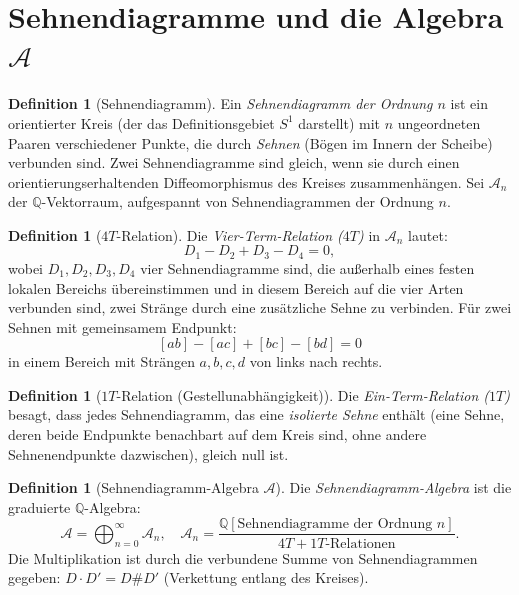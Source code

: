 \documentclass[12pt,a4paper]{amsart}
\theoremstyle{definition}
\newtheorem{definition_de}[theorem]{Definition}
\newcommand{\Q}{\mathbb{Q}}
\newcommand{\Ac}{\mathcal{A}}
\begin{document}
\section{Sehnendiagramme und die Algebra $\mathcal{A}$}\label{sec:sehnen}

\begin{definition_de}[Sehnendiagramm]
Ein \emph{Sehnendiagramm der Ordnung $n$} ist ein orientierter Kreis
(der das Definitionsgebiet $S^1$ darstellt) mit $n$ ungeordneten Paaren
verschiedener Punkte, die durch \emph{Sehnen} (Bögen im Innern der Scheibe)
verbunden sind.  Zwei Sehnendiagramme sind gleich, wenn sie durch einen
orientierungserhaltenden Diffeomorphismus des Kreises zusammenhängen.
Sei $\Ac_n$ der $\Q$-Vektorraum, aufgespannt von Sehnendiagrammen der
Ordnung $n$.
\end{definition_de}

\begin{definition_de}[$4T$-Relation]
Die \emph{Vier-Term-Relation ($4T$)} in $\Ac_n$ lautet:
\[
  D_1 - D_2 + D_3 - D_4 = 0,
\]
wobei $D_1, D_2, D_3, D_4$ vier Sehnendiagramme sind, die außerhalb eines
festen lokalen Bereichs übereinstimmen und in diesem Bereich auf die vier
Arten verbunden sind, zwei Stränge durch eine zusätzliche Sehne zu verbinden.
Für zwei Sehnen mit gemeinsamem Endpunkt:
\[
  [ab] - [ac] + [bc] - [bd] = 0
\]
in einem Bereich mit Strängen $a, b, c, d$ von links nach rechts.
\end{definition_de}

\begin{definition_de}[$1T$-Relation (Gestellunabhängigkeit)]
Die \emph{Ein-Term-Relation ($1T$)} besagt, dass jedes Sehnendiagramm,
das eine \emph{isolierte Sehne} enthält (eine Sehne, deren beide Endpunkte
benachbart auf dem Kreis sind, ohne andere Sehnenendpunkte dazwischen),
gleich null ist.
\end{definition_de}

\begin{definition_de}[Sehnendiagramm-Algebra $\mathcal{A}$]
Die \emph{Sehnendiagramm-Algebra} ist die graduierte $\Q$-Algebra:
\[
  \Ac = \bigoplus_{n=0}^\infty \Ac_n, \quad
  \Ac_n = \frac{\Q[\text{Sehnendiagramme der Ordnung } n]}{4T + 1T \text{-Relationen}}.
\]
Die Multiplikation ist durch die verbundene Summe von Sehnendiagrammen gegeben:
$D \cdot D' = D \# D'$ (Verkettung entlang des Kreises).
\end{definition_de}
\end{document}
